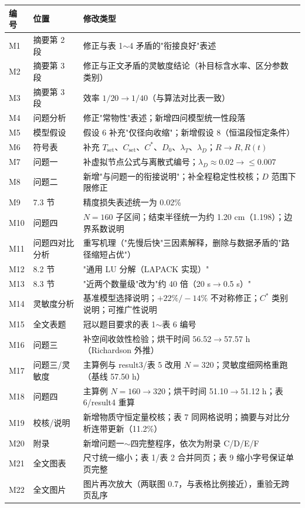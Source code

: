 \documentclass[UTF8,zihao=-4]{ctexart}
\begin{document}
\begin{center}
\begin{tabular}{lll}
\toprule
编号 & 位置 & 修改类型 \\
\midrule
M1 & 摘要第 2 段 & 修正与表 1$\sim$4 矛盾的"衔接良好"表述 \\
M2 & 摘要第 3 段 & 修正与正文矛盾的灵敏度结论（补目标含水率、区分参数类别） \\
M3 & 摘要第 3 段 & 效率 $1/20\to1/40$（与算法对比表一致） \\
M4 & 问题分析 & 修正"常物性"表述；新增四问模型统一性段落 \\
M5 & 模型假设 & 假设 6 补充"仅径向收缩"；新增假设 8（恒温段恒定条件） \\
M6 & 符号表 & 补充 $T_{\mathrm{set}}$、$C_{\mathrm{set}}$、$C^{*}$、$D_0$、$\lambda_T$、$\lambda_D$；$R\to R,R(t)$ \\
M7 & 问题一 & 补虚拟节点公式与离散式编号；$\lambda_D\approx0.02\to\le0.007$ \\
M8 & 问题二 & 新增"与问题一的衔接说明"；补全程稳定性校核；$D$ 范围下限修正 \\
M9 & 7.3 节 & 精度损失表述统一为 0.02\% \\
M10 & 问题四 & $N=160$ 子区间；结束半径统一为约 1.20 cm（1.198）；边界系数说明 \\
M11 & 问题四对比分析 & 重写机理（"先慢后快"三因素解释，删除与数据矛盾的"路径缩短占优"） \\
M12 & 8.2 节 & "通用 LU 分解（LAPACK 实现）" \\
M13 & 8.3 节 & "近两个数量级"改为"约 40 倍（20 s$\to$0.5 s）" \\
M14 & 灵敏度分析 & 基准模型选择说明；$+22\%/-14\%$ 不对称修正；$C^{*}$ 类别说明；可推广性说明 \\
M15 & 全文表题 & 冠以题目要求的表 1$\sim$表 6 编号 \\
\midrule
M16 & 问题三 & 补空间收敛性检验；烘干时间 56.52$\to$57.57 h（Richardson 外推） \\
M17 & 问题三/灵敏度 & 主算例与 result3/表 5 改用 $N=320$；灵敏度细网格重跑（基线 57.50 h） \\
M18 & 问题四 & 主算例 $N=160\to320$；烘干时间 51.10$\to$51.12 h；表 6/result4 重算 \\
M19 & 校核/说明 & 新增物质守恒定量校核；表 7 同网格说明；摘要与对比分析连带更新（11.2\%） \\
M20 & 附录 & 新增问题一$\sim$四完整程序，依次为附录 C/D/E/F \\
M21 & 全文图表 & 尺寸统一缩小；表 1/表 2 合并同页；表 9 缩小字号保证单页完整 \\
M22 & 全文图片 & 图片再次放大（两联图 0.7，与表格比例接近），重验无跨页乱序 \\
\bottomrule
\end{tabular}
\end{center}
\end{document}

